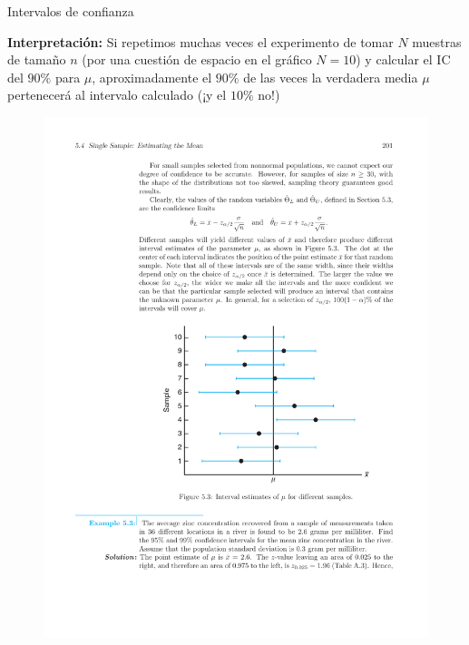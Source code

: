 \documentclass{beamer}
\theoremstyle{definition}
\begin{document}
\begin{frame}{\color{rosee}Intervalos de confianza} \small
  
  \textbf{Interpretación:}  Si repetimos muchas veces el experimento de tomar $N$ muestras de
    tama\~no $n$ (por una cuestión de espacio en el gráfico $N=10$) y calcular el IC del $90\%$ para $\mu$,
    aproximadamente el $90\%$ de las veces la verdadera media $\mu$
    pertenecer\'a al intervalo calculado (¡y el $10\%$ no!)
  
  \begin{figure}
    \begin{center}
      \includegraphics[height=.6\textheight]{img/intervalos}
    \end{center}
  \end{figure}
\end{frame}
\end{document}
